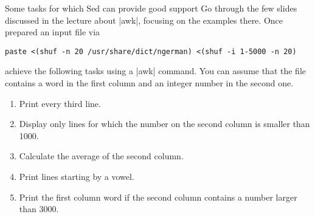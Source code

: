 
\begin{exercise}[Instructive]{Some tasks for which Sed can provide good support}
    Go through the few slides discussed in the lecture about \bash|awk|, focusing on the examples there.
    Once prepared an input file via
    \begin{lstlisting}[style=MyBash]
        paste <(shuf -n 20 /usr/share/dict/ngerman) <(shuf -i 1-5000 -n 20)
    \end{lstlisting}
    achieve the following tasks using a \bash|awk| command.
    You can assume that the file contains a word in the first column and an integer number in the second one.
    \begin{enumerate}
        \item Print every third line.
        \item Display only lines for which the number on the second column is smaller than 1000.
        \item Calculate the average of the second column.
        \item Print lines starting by a vowel.
        \item Print the first column word if the second column contains a number larger than 3000.
    \end{enumerate}
\end{exercise}

